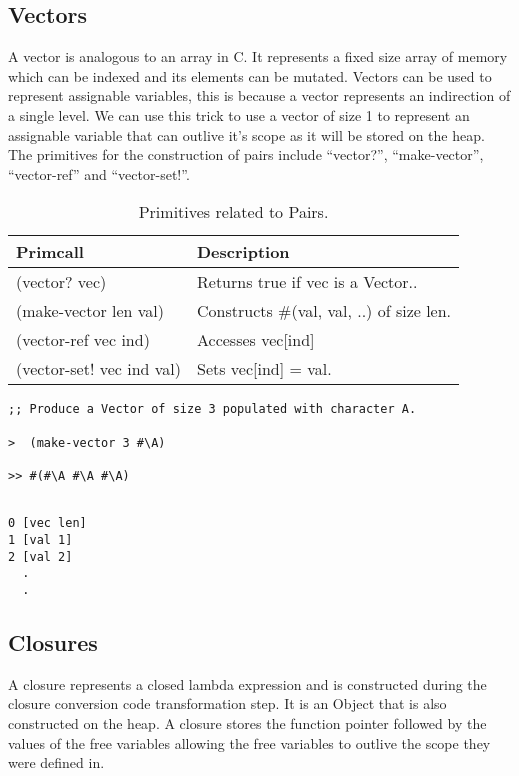 \documentclass{article}
\begin{document}
\subsection{Vectors}

A vector is analogous to an array in C. It represents a fixed size array of memory which can be indexed and its elements can be mutated. Vectors can be used to represent assignable variables, this is because a vector represents an indirection of a single level. We can use this trick to use a vector of size 1 to represent an assignable variable that can outlive it's scope as it will be stored on the heap. The primitives for the construction of pairs include ``vector?'', ``make-vector'', ``vector-ref'' and ``vector-set!''.  

\begin{table}[ht]
  \centering
\begin{tabular}{ l l }
  \toprule
  Primcall & Description \\ \hline
  \midrule
  (vector? vec) & Returns true if vec is a Vector.. \\
  (make-vector len val) & Constructs \#(val, val, ..) of size len. \\
  (vector-ref vec ind) & Accesses vec[ind] \\
  (vector-set! vec ind val) & Sets vec[ind] = val. \\
  \bottomrule
\end{tabular}
\caption{Primitives related to Pairs.} \label{tab:vectors}
\end{table}

\begin{verbatim}
;; Produce a Vector of size 3 populated with character A.

>  (make-vector 3 #\A) 

>> #(#\A #\A #\A)
\end{verbatim}


\begin{verbatim}

0 [vec len]
1 [val 1]
2 [val 2]
  .
  .

\end{verbatim}

\subsection{Closures}

A closure represents a closed lambda expression and is constructed during the closure conversion code transformation step. It is an Object that is also constructed on the heap. A closure stores the function pointer followed by the values of the free variables allowing the free variables to outlive the scope they were defined in.  
\end{document}
